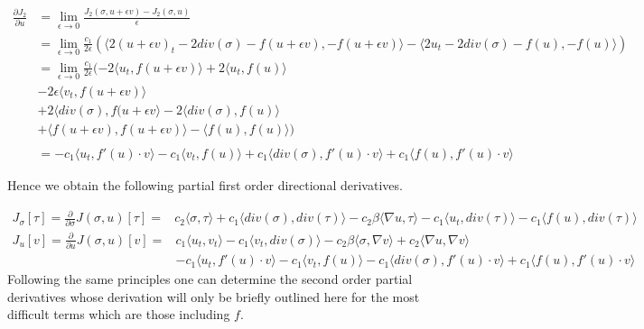 \documentclass[fleqn, a4paper, 11pt, bibliography=totoc]{report}
\begin{document}
\begin{equation}
\begin{aligned}
\frac{\partial J_2}{\partial u} &= \lim_{\epsilon \rightarrow 0} \frac{J_2(\sigma, u + \epsilon v) - J_2(\sigma, u)}{\epsilon}  \\
&= \lim_{\epsilon \rightarrow 0} \frac{c_1}{2 \epsilon} (\langle 2(u+ \epsilon v)_t - 2 div(\sigma) - f(u + \epsilon v), - f(u + \epsilon v) \rangle - \langle 2u_t - 2 div(\sigma) - f(u), -f(u) \rangle) \\
&= \lim_{\epsilon \rightarrow 0} \frac{c_1}{2 \epsilon}  (-2 \langle u_t, f(u+ \epsilon v) \rangle + 2 \langle u_t, f(u) \rangle \\
& - 2 \epsilon \langle v_t, f(u+ \epsilon v) \rangle \\
&+ 2 \langle div(\sigma), f(u + \epsilon v \rangle - 2 \langle div(\sigma), f(u) \rangle \\
&+ \langle f(u+ \epsilon v), f(u + \epsilon v) \rangle - \langle f(u), f(u) \rangle) \\
\\
&= - c_1 \langle u_t, f'(u) \cdot v \rangle - c_1 \langle v_t, f(u) \rangle + c_1 \langle div(\sigma), f'(u) \cdot v \rangle + c_1 \langle f(u), f'(u) \cdot v \rangle
\end{aligned}
\end{equation}

Hence we obtain the following partial first order directional derivatives. 

\begin{equation}
\begin{aligned}
J_{\sigma}[\tau] = \frac{\partial}{\partial \sigma}J(\sigma, u)[\tau] =& c_2 \langle \sigma, \tau \rangle + c_1 \langle div(\sigma), div(\tau) \rangle - c_2 \beta \langle \nabla u, \tau \rangle - c_1 \langle u_t, div(\tau) \rangle - c_1 \langle f(u), div(\tau) \rangle
\end{aligned}
\end{equation}
\begin{equation}
\begin{aligned}
J_{u} [v]= \frac{\partial}{\partial u} J(\sigma, u)[v] =&  c_1 \langle u_t, v_t \rangle - c_1 \langle v_t, div(\sigma) \rangle - c_2 \beta \langle \sigma, \nabla v \rangle + c_2 \langle \nabla u, \nabla v \rangle  \\  
&- c_1 \langle u_t, f'(u) \cdot v \rangle  - c_1 \langle v_t, f(u) \rangle  - c_1 \langle div(\sigma), f'(u) \cdot v \rangle + c_1 \langle f(u), f'(u) \cdot v \rangle 
\end{aligned}
\end{equation}
Following the same principles one can determine the second order partial derivatives whose derivation will only be briefly outlined here for the most difficult terms which are those including $f$.  
\end{document}
